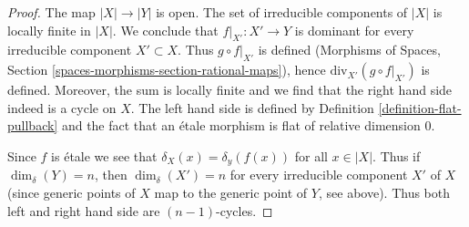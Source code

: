 \documentclass{stacks-project}
\theoremstyle{plain}
\theoremstyle{definition}
\theoremstyle{remark}
\numberwithin{equation}{subsection}
\begin{document}
\begin{proof}
The map $|X| \to |Y|$ is open. The set of irreducible components of $|X|$
is locally finite in $|X|$. We conclude that $f|_{X'} : X' \to Y$
is dominant for every irreducible component $X' \subset X$.
Thus $g \circ f|_{X'}$ is defined (Morphisms of Spaces, Section
\ref{spaces-morphisms-section-rational-maps}), hence
$\text{div}_{X'}(g \circ f|_{X'})$ is defined. Moreover, the
sum is locally finite and we find that the right hand side indeed
is a cycle on $X$. The left hand side is defined by
Definition \ref{definition-flat-pullback}
and the fact that an \'etale morphism is flat of relative dimension $0$.

\medskip\noindent
Since $f$ is \'etale we see that $\delta_X(x) = \delta_y(f(x))$
for all $x \in |X|$. Thus if $\dim_\delta(Y) = n$, then $\dim_\delta(X') = n$
for every irreducible component $X'$ of $X$ (since generic points of $X$
map to the generic point of $Y$, see above). Thus both left
and right hand side are $(n - 1)$-cycles.


\end{proof}
\end{document}
